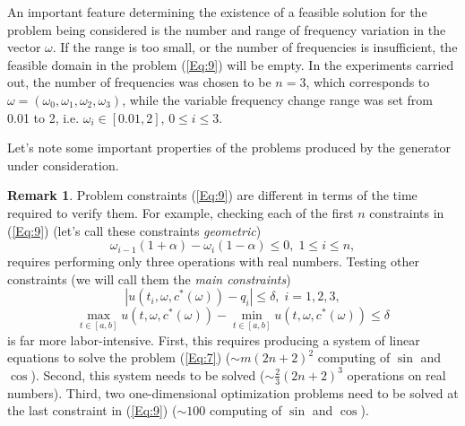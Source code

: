 \documentclass{llncs}
\begin{document}
An important feature determining the existence of a feasible solution for the problem being considered is the number and range of frequency variation in the vector $\omega$. If the range is too small, or the number of frequencies is insufficient, the feasible domain in the problem (\ref{Eq:9}) will be empty. In the experiments carried out, the number of frequencies was chosen to be $n=3$, which corresponds to $\omega=(\omega_0,\omega_1,\omega_2,\omega_3)$, while the variable frequency change range was set from 0.01 to 2, i.e. $\omega_i\in[0.01, 2]$, $0\leq i\leq 3$.

Let's note some important properties of the problems produced by the generator under consideration.

\textbf{Remark 1}. Problem constraints (\ref{Eq:9}) are different in terms of the time required to verify them. For example, checking each of the first $n$ constraints in (\ref{Eq:9}) (let's call these constraints \textit{geometric})
\[
\omega_{i-1}(1+\alpha)-\omega_i(1-\alpha)\leq 0, \; 1\leq i \leq n,
\]
requires performing only three operations with real numbers. Testing other constraints (we will call them the \textit{main constraints}) 
\[
\left|u(t_i,\omega,c^\ast(\omega))-q_i\right|\leq\delta, \; i=1,2,3,
\]
\[
\max_{t\in[a,b]}{u(t,\omega,c^\ast(\omega))}-\min_{t\in[a,b]}{u(t,\omega,c^\ast(\omega))}\leq\delta
\]
is far more labor-intensive. First, this requires producing a system of linear equations to solve the problem (\ref{Eq:7}) ($\sim m(2n+2)^2$ computing of $\sin$ and $\cos$). Second, this system needs to be solved ($\sim \frac{2}{3}(2n+2)^3$ operations on real numbers). Third, two one-dimensional optimization problems need to be solved at the last constraint in (\ref{Eq:9}) ($\sim 100$ computing of $\sin$ and $\cos$).
\end{document}
